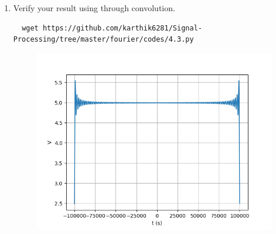 \documentclass[journal,12pt,twocolumn]{IEEEtran}
\renewcommand\thesection{\arabic{section}}
\begin{document}
\begin{enumerate}[label=\thesection.\arabic*
,ref=\thesection.\theenumi]
\begin{align}
h(t)=\frac{2V_0\pi f_0}{A_0}\sinc{4f_0t}
\end{align}
\item Verify your result using  through convolution.
\solution 
\begin{lstlisting}
  wget https://github.com/karthik6281/Signal-Processing/tree/master/fourier/codes/4.3.py
\end{lstlisting}
\begin{figure}[!ht]
  \centering
  \includegraphics[width=\columnwidth]{./figs/4.3.png  }
  \caption{}
\end{figure}
\end{enumerate}
\end{document}

